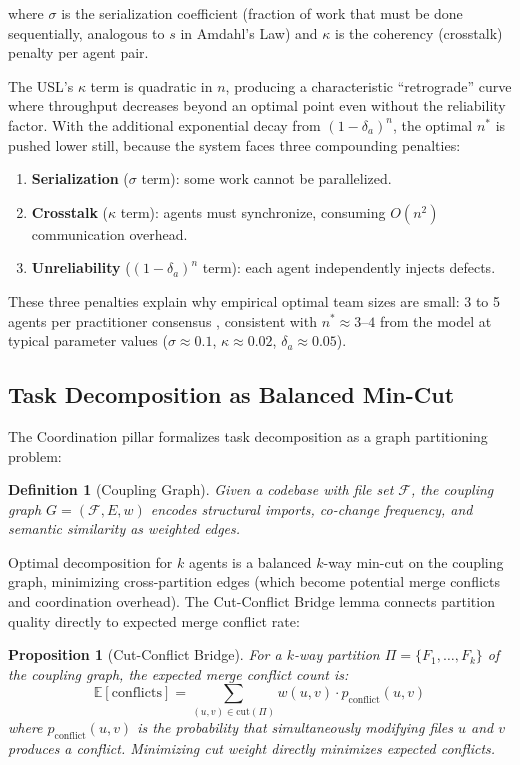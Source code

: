 \documentclass[11pt, a4paper, logo, copyright]{googledeepmind}
\newtheorem{definition}{Definition}[section]
\newtheorem{proposition}{Proposition}[section]
\begin{document}
where $\sigma$ is the serialization coefficient (fraction of work that must be done sequentially, analogous to $s$ in Amdahl's Law) and $\kappa$ is the coherency (crosstalk) penalty per agent pair.

The USL's $\kappa$ term is quadratic in $n$, producing a characteristic ``retrograde'' curve where throughput decreases beyond an optimal point even without the reliability factor. With the additional exponential decay from $(1-\delta_a)^n$, the optimal $n^*$ is pushed lower still, because the system faces three compounding penalties:

\begin{enumerate}[nosep]
    \item \textbf{Serialization} ($\sigma$ term): some work cannot be parallelized.
    \item \textbf{Crosstalk} ($\kappa$ term): agents must synchronize, consuming $O(n^2)$ communication overhead.
    \item \textbf{Unreliability} ($(1-\delta_a)^n$ term): each agent independently injects defects.
\end{enumerate}

These three penalties explain why empirical optimal team sizes are small: 3 to 5 agents per practitioner consensus \citep{osmani2025}, consistent with $n^* \approx 3$--$4$ from the model at typical parameter values ($\sigma \approx 0.1$, $\kappa \approx 0.02$, $\delta_a \approx 0.05$).

\subsection{Task Decomposition as Balanced Min-Cut}

The Coordination pillar formalizes task decomposition as a graph partitioning problem:

\begin{definition}[Coupling Graph]
Given a codebase with file set $\mathcal{F}$, the coupling graph $G = (\mathcal{F}, E, w)$ encodes structural imports, co-change frequency, and semantic similarity as weighted edges.
\end{definition}

Optimal decomposition for $k$ agents is a balanced $k$-way min-cut on the coupling graph, minimizing cross-partition edges (which become potential merge conflicts and coordination overhead). The Cut-Conflict Bridge lemma connects partition quality directly to expected merge conflict rate:

\begin{proposition}[Cut-Conflict Bridge]
\label{prop:cut-conflict}
For a $k$-way partition $\Pi = \{F_1, \ldots, F_k\}$ of the coupling graph, the expected merge conflict count is:
\begin{equation}
    \mathbb{E}[\text{conflicts}] = \sum_{(u,v) \in \text{cut}(\Pi)} w(u,v) \cdot p_{\text{conflict}}(u,v)
\end{equation}
where $p_{\text{conflict}}(u,v)$ is the probability that simultaneously modifying files $u$ and $v$ produces a conflict. Minimizing cut weight directly minimizes expected conflicts.
\end{proposition}
\end{document}
